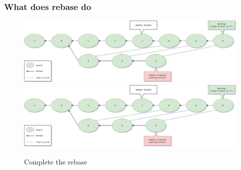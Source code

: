 \begin{frame}[fragile]
    \frametitle{What does rebase do}
    \begin{figure}
        \begin{center}
            {
                \includegraphics[width=1\textwidth,keepaspectratio]{./images/Rebase-Completed.png}
            }
            {
                \includegraphics[width=1\textwidth,keepaspectratio]{./images/Rebase-Completed.png}
            }
            \caption{Complete the rebase}
        \end{center}
    \end{figure}
\end{frame}

